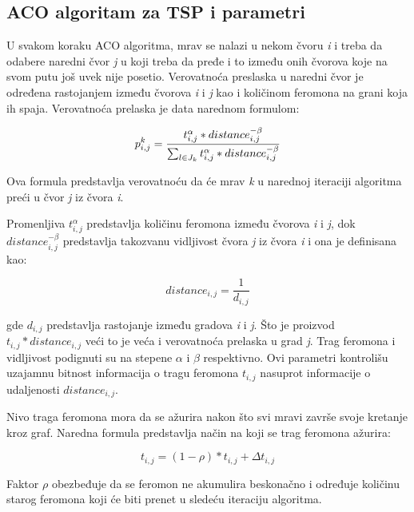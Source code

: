 \documentclass[a4paper]{article}
\begin{document}
\subsection{ACO algoritam za TSP i parametri}
\label{subsec:podnaslov1}

U svakom koraku ACO algoritma, mrav se nalazi u nekom čvoru \textit{i} i treba da odabere naredni čvor \textit{j} u koji treba da pređe i to između onih čvorova koje na svom putu još uvek nije posetio. Verovatnoća preslaska u naredni čvor je određena rastojanjem između čvorova \textit{i} i \textit{j} kao i količinom feromona na grani koja ih spaja. Verovatnoća prelaska je data narednom formulom:

\begin{equation}\label{1}
p_{i,j}^k = {t_{i,j}^\alpha * distance_{i,j}^{-\beta} \over \sum_{l \in J_k}^{} t_{i,j}^\alpha * distance_{i,j}^{-\beta}}
\end{equation}

Ova formula predstavlja verovatnoću da će mrav \textit{k} u narednoj iteraciji algoritma preći u čvor \textit{j} iz čvora \textit{i}.


Promenljiva $t_{i,j}^\alpha$ predstavlja količinu feromona između čvorova \textit{i} i \textit{j}, dok $distance_{i,j}^{-\beta}$ predstavlja takozvanu vidljivost čvora \textit{j}  iz čvora \textit{i} i ona je definisana kao:

\begin{equation}\label{2}
distance_{i,j} = \frac{1}{d_{i,j}}
\end{equation}

gde $d_{i,j}$ predstavlja rastojanje između gradova \textit{i} i \textit{j}. Što je proizvod $t_{i,j} * distance_{i,j}$ veći to je veća i verovatnoća prelaska u grad \textit{j}. Trag feromona i vidljivost podignuti su na stepene $\alpha$ i $\beta$ respektivno. Ovi parametri kontrolišu uzajamnu bitnost informacija o tragu feromona $t_{i,j}$ nasuprot informacije o udaljenosti $distance_{i,j}$.

Nivo traga feromona mora da se ažurira nakon što svi mravi završe svoje kretanje kroz graf. Naredna formula predstavlja način na koji se trag feromona ažurira:

\begin{equation}\label{3}
t_{i,j} = (1-\rho) * t_{i,j} + \Delta t_{i,j}
\end{equation}

Faktor $\rho$ obezbeđuje da se feromon ne akumulira beskonačno i određuje količinu starog feromona koji će biti prenet u sledeću iteraciju algoritma.
\end{document}
